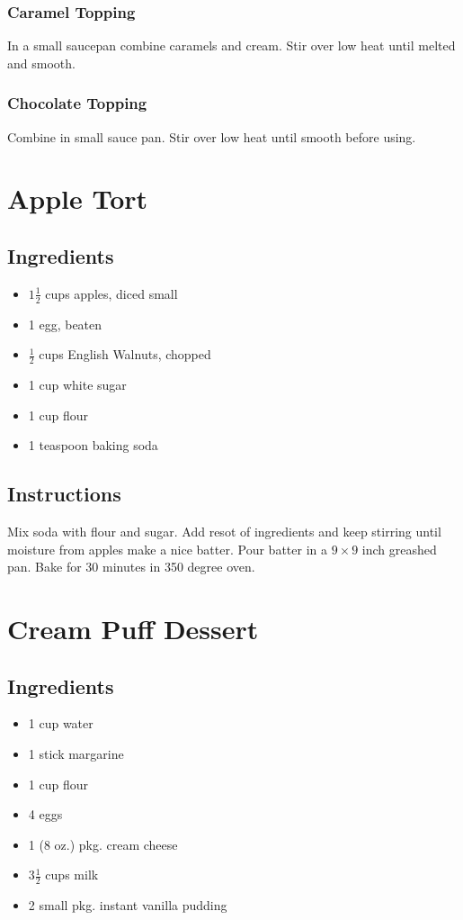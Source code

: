 \documentclass{book}
\begin{document}
\subsubsection*{Caramel Topping}
In a small saucepan combine caramels and cream. Stir over low heat until melted and smooth.
\subsubsection*{Chocolate Topping}
Combine in small sauce pan. Stir over low heat until smooth before using.
\newpage
{}
\section*{Apple Tort}
\subsection*{Ingredients}
\begin{itemize}
\item
$1\frac{1}{2}$ cups apples, diced small
\item
1 egg, beaten
\item
$\frac{1}{2}$ cups English Walnuts, chopped
\item
1 cup white sugar
\item
1 cup flour
\item
1 teaspoon baking soda
\end{itemize}
\subsection*{Instructions}
Mix soda with flour and sugar. Add resot of ingredients and keep stirring until moisture from apples make a nice batter. Pour batter in a $9 \times 9$ inch greashed pan. Bake for 30 minutes in 350 degree oven.
\newpage
{}
\section*{Cream Puff Dessert}
\subsection*{Ingredients}
\begin{itemize}
\item
1 cup water
\item
1 stick margarine
\item
1 cup flour
\item
4 eggs
\item
1 (8 oz.) pkg. cream cheese
\item
$3 \frac{1}{2}$ cups milk
\item
2 small pkg. instant vanilla pudding
\end{itemize}
\end{document}
